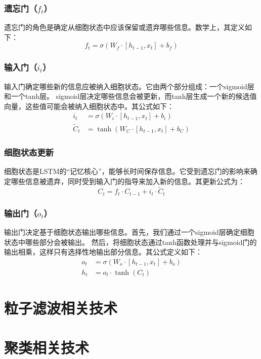 \subsubsection{遗忘门（\(f_t\)）}
遗忘门的角色是确定从细胞状态中应该保留或遗弃哪些信息。数学上，其定义如下：
\begin{equation}
f_t = \sigma(W_f \cdot [h_{t-1}, x_t] + b_f)
\end{equation}

\subsubsection{输入门（\(i_t\)）}
输入门确定哪些新的信息应被纳入细胞状态。它由两个部分组成：一个sigmoid层和一个tanh层。
sigmoid层决定哪些信息会被更新，而tanh层生成一个新的候选值向量，这些值可能会被纳入细胞状态中。其公式如下：
\begin{align}
i_t &= \sigma(W_i \cdot [h_{t-1}, x_t] + b_i) \\
\tilde{C}_t &= \tanh(W_C \cdot [h_{t-1}, x_t] + b_C)
\end{align}

\subsubsection{细胞状态更新}
细胞状态是LSTM的“记忆核心”，能够长时间保存信息。它受到遗忘门的影响来确定哪些信息被遗弃，同时受到输入门的指导来加入新的信息。其更新公式为：
\begin{equation}
C_t = f_t \cdot C_{t-1} + i_t \cdot \tilde{C}_t
\end{equation}

\subsubsection{输出门（\(o_t\)）}
输出门决定基于细胞状态输出哪些信息。首先，我们通过一个sigmoid层确定细胞状态中哪些部分会被输出。
然后，将细胞状态通过tanh函数处理并与sigmoid门的输出相乘，这样只有选择性地输出部分信息。其公式定义如下：
\begin{align}
o_t &= \sigma(W_o \cdot [h_{t-1}, x_t] + b_o) \\
h_t &= o_t \cdot \tanh(C_t)
\end{align}

\section{粒子滤波相关技术}

\section{聚类相关技术}


